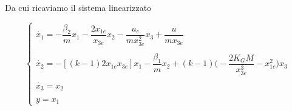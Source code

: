     Da cui ricaviamo il sistema linearizzato

    \begin{equation}
        \left\{ \begin{array}{ll}
            \dot{x_1}= -\dfrac{\beta_2}{m}x_1-\dfrac{2x_{1e}}{x_{3e}}x_2-\dfrac{u_e}{mx^2_{3e}}x_3+\dfrac{u}{mx_{3e}}\\\\
            \dot{x_2}= -[(k-1)2x_{1e}x_{3e}]x_1-\dfrac{\beta_1}{m}x_2+(k-1) \Biggl( -\dfrac{2K_GM}{x^3_{3e}}-x^2_{1e} \Biggr)  x_3\\\\
            \dot{x_3}= x_2\\\\
            y= x_1
        \end{array} \right.
    \end{equation}

